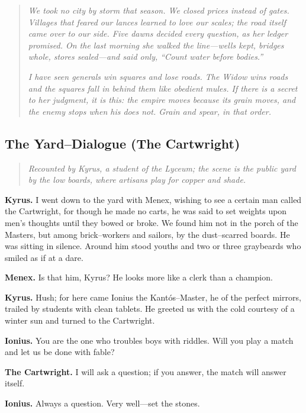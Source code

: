 \documentclass[11pt]{article}
\begin{document}
\begin{quote}
\emph{We took no city by storm that season. We closed prices instead of gates. Villages that feared our lances learned to love our scales; the road itself came over to our side. Five dawns decided every question, as her ledger promised. On the last morning she walked the line—wells kept, bridges whole, stores sealed—and said only, “Count water before bodies.”}

\emph{I have seen generals win squares and lose roads. The Widow wins roads and the squares fall in behind them like obedient mules. If there is a secret to her judgment, it is this: the empire moves because its grain moves, and the enemy stops when his does not. Grain and spear, in that order.}
\end{quote}

\clearpage
\subsection*{The Yard–Dialogue (The Cartwright)}

\begin{quote}\small\itshape
Recounted by Kyrus, a student of the Lyceum; the scene is the public yard by the low boards, where artisans play for copper and shade.
\end{quote}

\noindent\textbf{Kyrus.} I went down to the yard with Menex, wishing to see a certain man called the Cartwright, for though he made no carts, he was said to set weights upon men’s thoughts until they bowed or broke. We found him not in the porch of the Masters, but among brick–workers and sailors, by the dust–scarred boards. He was sitting in silence. Around him stood youths and two or three graybeards who smiled as if at a dare.

\noindent\textbf{Menex.} Is that him, Kyrus? He looks more like a clerk than a champion.

\noindent\textbf{Kyrus.} Hush; for here came Ionius the Kantós–Master, he of the perfect mirrors, trailed by students with clean tablets. He greeted us with the cold courtesy of a winter sun and turned to the Cartwright.

\noindent\textbf{Ionius.} You are the one who troubles boys with riddles. Will you play a match and let us be done with fable?

\noindent\textbf{The Cartwright.} I will ask a question; if you answer, the match will answer itself.

\noindent\textbf{Ionius.} Always a question. Very well—set the stones.
\end{document}
